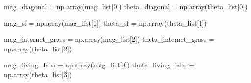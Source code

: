 \documentclass[
  letterpaper,
  DIV=11,
  numbers=noendperiod]{scrreprt}
\newenvironment{Shaded}{\begin{snugshade}}{\end{snugshade}}
\newcommand{\DecValTok}[1]{\textcolor[rgb]{0.68,0.00,0.00}{#1}}
\newcommand{\NormalTok}[1]{\textcolor[rgb]{0.00,0.23,0.31}{#1}}
\newcommand{\OperatorTok}[1]{\textcolor[rgb]{0.37,0.37,0.37}{#1}}
\begin{document}
\begin{Shaded}
\begin{Highlighting}[]
\NormalTok{mag\_diagonal }\OperatorTok{=}\NormalTok{ np.array(mag\_list[}\DecValTok{0}\NormalTok{])}
\NormalTok{theta\_diagonal }\OperatorTok{=}\NormalTok{ np.array(theta\_list[}\DecValTok{0}\NormalTok{])}


\NormalTok{mag\_sf }\OperatorTok{=}\NormalTok{ np.array(mag\_list[}\DecValTok{1}\NormalTok{])}
\NormalTok{theta\_sf }\OperatorTok{=}\NormalTok{ np.array(theta\_list[}\DecValTok{1}\NormalTok{])}


\NormalTok{mag\_internet\_grass }\OperatorTok{=}\NormalTok{ np.array(mag\_list[}\DecValTok{2}\NormalTok{])}
\NormalTok{theta\_internet\_grass }\OperatorTok{=}\NormalTok{ np.array(theta\_list[}\DecValTok{2}\NormalTok{])}


\NormalTok{mag\_living\_labs }\OperatorTok{=}\NormalTok{ np.array(mag\_list[}\DecValTok{3}\NormalTok{])}
\NormalTok{theta\_living\_labs }\OperatorTok{=}\NormalTok{ np.array(theta\_list[}\DecValTok{3}\NormalTok{])}
\end{Highlighting}
\end{Shaded}
\end{document}
